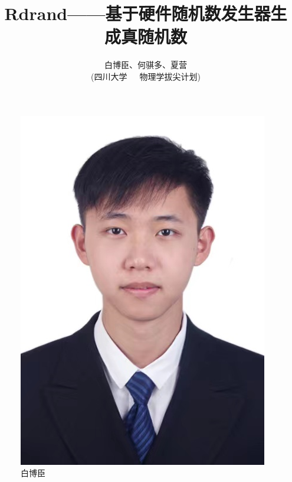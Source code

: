 \documentclass[12pt,a4paper]{article}%
\title{\fontsize{18pt}{27pt}\selectfont%
{\heiti%
Rdrand——基于硬件随机数发生器生成真随机数}}%
\author{\fontsize{12pt}{18pt}\selectfont%
{\fangsong%
白博臣、何骐多、夏营}\\%
\fontsize{10.5pt}{15.75pt}\selectfont%
{\fangsong%
(四川大学~~~物理学拔尖计划)}}%
\date{}%
\begin{document}
    \maketitle%
    \lhead{}%
    \chead{}%
    \rhead{}%
    \lfoot{}%
    \cfoot{\thepage}%
    \rfoot{}%
    \begin{figure}[h]
        \centering
        \begin{minipage}{0.32\textwidth}
            \centering
            \includegraphics[width=\linewidth]{bbc}
            \caption{白博臣}
            \label{fig:img1}
        \end{minipage}\hfill
        \begin{minipage}{0.305\textwidth}

\end{minipage}
\end{figure}
\end{document}
